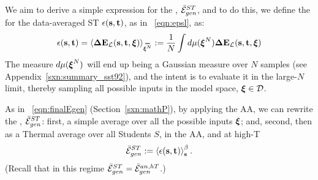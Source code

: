 We aim to derive a simple expression for the  \AverageSTGeneralizationError, $\bar{\mathcal{E}}^{ST}_{gen}$, and to do this, 
we define the  \EffectivePotential for the data-averaged ST \GeneralizationError $\epsilon({\mathbf{s}},{\mathbf{t}})$, as in \EQN~\ref{eqn:epsl}, as:
\begin{align}
\label{eqn:STerror}
\EPSLSTx = \langle\DETOPSTL\rangle_{\AVGNDXI}:=\frac{1}{N}\int d\mu(\NDXI)\DETOPSTL
\end{align}
The measure $d\mu(\boldsymbol{\xi}^{N})$ will end up being a Gaussian measure over $N$ samples
(see Appendix~\ref{sxn:summary_sst92}), and the intent is to evaluate it
in the large-$N$ limit, thereby sampling all possible inputs in the model space, $\boldsymbol{\xi}\in\mathcal{D}$.

As in \EQN~\ref{eqn:finalEgen} (Section~\ref{sxn:mathP}), by applying the AA, we can rewrite the \AverageSTGeneralizationError, $\bar{\mathcal{E}}^{ST}_{gen}$:
first, a simple average over all the possible inputs $\boldsymbol{\xi}$; and, 
second, then as a Thermal average over all Students $S$, in the AA, and at high-T 
\begin{align}
\label{eqn:MGE}
\bar{\mathcal{E}}^{ST}_{gen}:=\left\langle \epsilon({\mathbf{s}}, {\mathbf{t}} ) \right\rangle_{\mathbf s}^{\beta} .
\end{align}
(Recall that in this regime $\bar{\mathcal{E}}^{ST}_{gen}=\bar{\mathcal{E}}_{gen}^{an,hT}$.)


